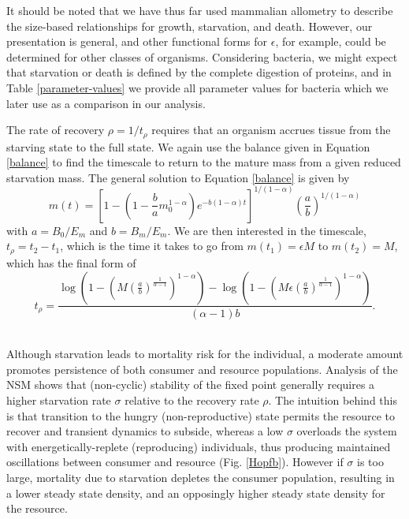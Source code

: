 \documentclass[12pt,english]{article}
\begin{document}
\begin{spacing}{1.9}
It should be noted that we have thus far used mammalian allometry to describe the size-based relationships for growth, starvation, and death. However, our presentation is general, and other functional forms for $\epsilon$, for example, could be determined for other classes of organisms. Considering bacteria, we might expect that starvation or death is defined by the complete digestion of proteins, and in Table \ref{parameter-values} we provide all parameter values for bacteria which we later use as a comparison in our analysis. 

The rate of recovery $\rho = 1/t_\rho$ requires that an organism accrues tissue from the starving state to the full state.
We again use the balance given in Equation \ref{balance} to find the timescale to return to the mature mass from a given reduced starvation mass. The general solution to Equation \ref{balance} is given by
\begin{equation}
m\left(t\right)=\left[1-\left(1-\frac{b}{a}m_{0}^{1-\alpha}\right)e^{-b\left(1-\alpha\right)t}\right]^{1/\left(1-\alpha\right)}\left(\frac{a}{b}\right)^{1/\left(1-\alpha\right)}
\end{equation}
with $a=B_{0}/E_{m}$ and $b=B_{m}/E_{m}$. We are then interested in the timescale, $t_{\rho}=t_{2}-t_{1}$, which is the time it takes to go from $m\left(t_{1}\right)=\epsilon M$ to $m\left(t_{2}\right)=M$, which has the final form of 
\begin{equation}
t_{\rho}=\frac{\log \left(1-\left(M \left(\frac{a}{b}\right)^{\frac{1}{\alpha -1}}\right)^{1-\alpha }\right)-\log \left(1-\left(M \epsilon  \left(\frac{a}{b}\right)^{\frac{1}{\alpha
   -1}}\right)^{1-\alpha }\right)}{(\alpha -1) b}.
\end{equation}








 \\ \noindent
Although starvation leads to mortality risk for the individual, a moderate amount promotes persistence of both consumer and resource populations.
Analysis of the NSM shows that (non-cyclic) stability of the fixed point generally requires a higher starvation rate $\sigma$ relative to the recovery rate $\rho$.
The intuition behind this is that transition to the hungry (non-reproductive) state permits the resource to recover and transient dynamics to subside, whereas a low $\sigma$ overloads the system with energetically-replete (reproducing) individuals, thus producing maintained oscillations between consumer and resource (Fig. \ref{Hopfb}).
However if $\sigma$ is too large, mortality due to starvation depletes the consumer population, resulting in a lower steady state density, and an opposingly higher steady state density for the resource.


\end{spacing}
\end{document}
